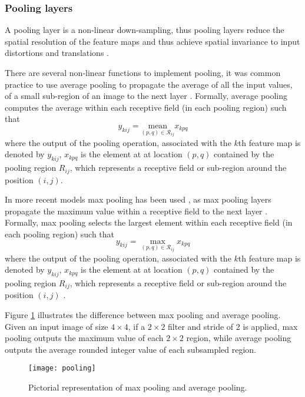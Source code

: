 \subsubsection{Pooling layers}

A pooling layer is a non-linear down-sampling, thus pooling layers reduce the
spatial resolution of the feature maps and thus achieve spatial invariance
to input distortions and translations \citep{LeCun1998, LeCun1990,
LeCun1989, LeCun2015, Ranzato2007}.

There are several non-linear functions to implement pooling, it was common
practice to use average pooling to propagate the average of all the input
values, of a small sub-region of an image to the next layer \citep{LeCun1990,
LeCun1989, LeCun1998}. Formally, average pooling computes the average
within each receptive field (in each pooling region) such that
$$y_{kij} = \displaystyle \underset{(p,q) \in \mathcal{R}_{ij}}{\text{mean}} x_{kpq}$$
where the output of the pooling operation, associated with the $k$th feature
map is denoted by $y_{kij}$, $x_{kpq}$ is the element at at location $(p,q)$
contained by the pooling region $R_{i j}$, which represents a receptive
field or sub-region around the position $(i, j)$.

In more recent models max pooling has been used \citep{Szegedy2014,
Krizhevsky2012, Simonyan2014, Zeiler2013, Xu2015}, as max pooling layers
propagate the maximum value within a receptive field to the next layer
\citep{Ranzato2007}. Formally, max pooling selects the largest element
within each receptive field (in each pooling region) such that
$$y_{kij} = \displaystyle \max_{(p,q) \in \mathcal{R}_{ij}} x_{kpq}$$
where the output of the pooling operation, associated with the $k$th feature
map is denoted by $y_{kij}$, $x_{kpq}$ is the element at at location $(p,q)$
contained by the pooling region $R_{i j}$, which represents a receptive
field or sub-region around the position $(i, j)$ \citep{Yu2014}.

Figure \ref{fig:pooling} illustrates the difference between max pooling
and average pooling. Given an input image of size $4\times 4$, if a
$2\times 2$ filter and stride of 2 is applied, max pooling outputs the
maximum value of each $2\times 2$ region, while average pooling outputs
the average rounded integer value of each subsampled region.

\begin{figure}[!h]
	\centering
	\texttt{[image: pooling]}
	\caption[Pictorial representation of max pooling and average pooling ]
	{Pictorial representation of max pooling and average pooling.}
  \label{fig:pooling}
\end{figure}

